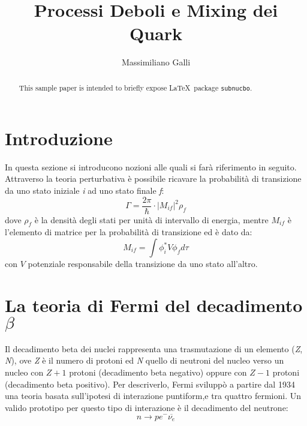 \documentclass{subnucbo}
\title{Processi Deboli e Mixing dei Quark}
\author{Massimiliano Galli}
\begin{document}
\maketitle

\begin{abstract}
This sample paper is intended to briefly expose \LaTeX\ package \texttt{subnucbo}.
\end{abstract}

\section{Introduzione}
In questa sezione si introducono nozioni alle quali si farà riferimento in seguito.\\
Attraverso la teoria perturbativa è possibile ricavare la probabilità di transizione da uno stato iniziale \textit{i} ad uno stato finale \textit{f}:
\begin{equation}
        \Gamma = \frac{2 \pi} {\hbar} \cdot | M_{if}|^{2} \rho_{f}
        \label{eq:decay_rate}
\end{equation}
dove $\rho_{f}$ è la densità degli stati per unità di intervallo di energia, mentre $M_{if}$ è l'elemento di matrice per la probabilità di transizione ed è dato da:
\begin{equation}
        M_{if} = \int \phi^{*}_{i} V \phi_{f} d\tau
        \label{eq:matrix_element}
\end{equation}
con $V$ potenziale responsabile della transizione da uno stato all'altro.

\section{La teoria di Fermi del decadimento $\beta$}
Il decadimento beta dei nuclei rappresenta una trasmutazione di un elemento (\textit{Z}, \textit{N}), ove \textit{Z} è il numero di protoni ed \textit{N} quello di neutroni del nucleo verso un nucleo con $\textit{Z} + 1$ protoni (decadimento beta negativo) oppure con $\textit{Z} - 1$ protoni (decadimento beta positivo). Per descriverlo, Fermi sviluppò a partire dal 1934 una teoria basata sull'ipotesi di interazione puntiform,e tra quattro fermioni. Un valido prototipo per questo tipo di interazione è il decadimento del neutrone:
\begin{equation}
        n \rightarrow p e^{-} \overline{\nu_{e}}
        \label{eq:neutro_decay}
\end{equation}

\appendix
\end{document}
